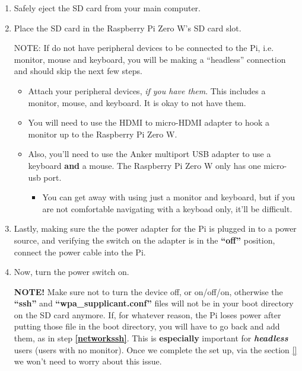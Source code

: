 \documentclass{article}
\begin{document}
\begin{enumerate}
  \item Safely eject the SD card from your main computer.
  \item Place the SD card in the Raspberry Pi Zero W's SD card slot.
  
NOTE: If do not have peripheral devices to be connected to the Pi, i.e. monitor, mouse and keyboard, you will be making a ``headless'' connection and should skip the next few steps. 
\begin{itemize}
  \item Attach your peripheral devices, \textit{if you have them}. This includes a monitor, mouse, and keyboard. It is okay to not have them.
    \item You will need to use the HDMI to micro-HDMI adapter to hook a monitor up to the Raspberry Pi Zero W.
    \item Also, you'll need to use the Anker multiport USB adapter to use a keyboard \textbf{and} a mouse. The Raspberry Pi Zero W only has one micro-usb port.
    \begin{itemize}
     \item You can get away with using just a monitor and keyboard, but if you are not comfortable navigating with a keyboad only, it'll be difficult.
    \end{itemize}
  \end{itemize}
  
  
\item Lastly, making sure the the power adapter for the Pi is plugged in to a power source, and verifying the switch on the adapter is in the \textbf{``off''} position, connect the power cable into the Pi.
  \item Now, turn the power switch on.

\textbf{NOTE!} Make sure not to turn the device off, or on/off/on, otherwise the \textbf{``ssh''} and \textbf{``wpa\_supplicant.conf''} files will not be in your boot directory on the SD card anymore. If, for whatever reason, the Pi loses power after putting those file in the boot directory, you will have to go back and add them, as in step \textbf{\ref{networkssh}}. This is \textbf{especially} important for \textbf{\textit{headless}} users (users with no monitor). Once we complete the set up, via the section \ref{} we won't need to worry about this issue. 


\end{enumerate}
\end{document}
